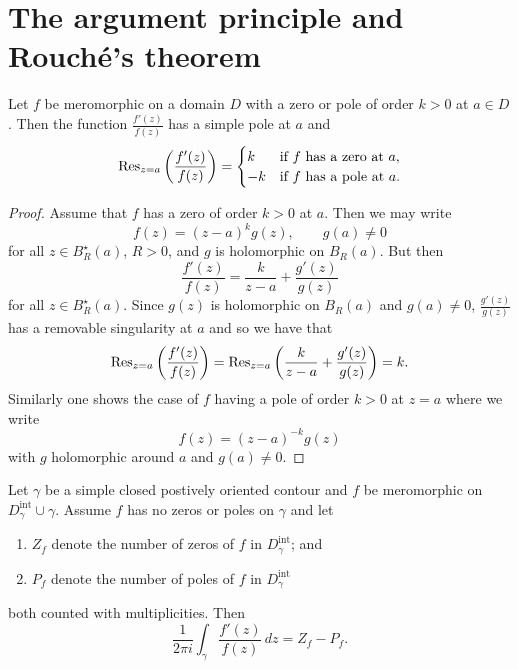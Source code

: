 \section{The argument principle and Rouch\'e's theorem}

\begin{lemma}[]
    Let $f$ be meromorphic on a domain $D$ 
    with a zero or pole of order $k > 0$ at $a \in D$.
    Then the function $\frac{f'(z)}{f(z)}$ has a simple pole at $a$ and
    \[
        \operatorname{Res}_{z=a} \left(\frac{f'(z)}{f(z)}\right) =
        \begin{cases}
            k  & \text{if $f$ has a zero at $a$}, \\
            -k & \text{if $f$ has a pole at $a$}.
        \end{cases}
    \]
\end{lemma}

\begin{proof}
    Assume that $f$ has a zero of order $k > 0$ at $a$.
    Then we may write
    \[
        f(z) = (z-a)^k g(z), \qquad g(a) \neq 0
    \]
    for all $z \in B_R^\star(a)$, $R>0$, and $g$ is holomorphic on $B_R(a)$.
    But then
    \[
        \frac{f'(z)}{f(z)} = \frac{k}{z - a} + \frac{g'(z)}{g(z)} 
    \]
    for all $z \in B_R^\star(a)$.
    Since $g(z)$ is holomorphic on $B_R(a)$ and $g(a) \neq 0$,
    $\frac{g'(z)}{g(z)}$ has a removable singularity at $a$ and so we have that
    \[
        \operatorname{Res}_{z=a} \left(\frac{f'(z)}{f(z)}\right)
        = \operatorname{Res}_{z=a} \left(\frac{k}{z-a} + \frac{g'(z)}{g(z)}\right) 
        = k.
    \]
    Similarly one shows the case of $f$ having a pole of order $k > 0$ at $z = a$
    where we write
    \[
        f(z) = (z-a)^{-k} g(z)
    \]
    with $g$ holomorphic around $a$ and $g(a) \neq 0$.
\end{proof}

\begin{theorem}
    Let $\gamma$ be a simple closed postively oriented contour
    and $f$ be meromorphic on $D_\gamma^{\text{int}} \cup \gamma$.
    Assume $f$ has no zeros or poles on $\gamma$ 
    and let
    \begin{enumerate}
        \item $Z_f$ denote the number of zeros of $f$ in $D_\gamma^{\text{int}}$; and
        \item $P_f$ denote the number of poles of $f$ in $D_\gamma^{\text{int}}$
    \end{enumerate}
    both counted with multiplicities.
    Then
    \[
        \frac{1}{2\pi i} \int_\gamma \frac{f'(z)}{f(z)} \,dz = Z_f - P_f.
    \]
\end{theorem}

